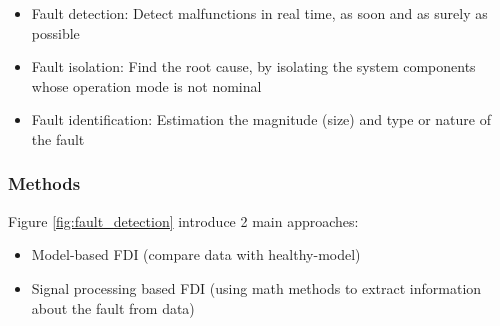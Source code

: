 \documentclass[class=article, crop=false]{standalone}
\begin{document}
\begin{itemize}
    \item{Fault detection: Detect malfunctions in real time, as soon and as
        surely as possible}
    \item{Fault isolation: Find the root cause, by isolating the system
        components whose operation mode is not nominal}
    \item{Fault identification: Estimation the magnitude (size) and type or
            nature of the fault}
\end{itemize}



\subsubsection{Methods}
Figure \ref{fig:fault_detection} introduce 2 main approaches:

\begin{itemize}
\item{Model-based FDI (compare data with healthy-model)}
\item{Signal processing based FDI (using math methods to extract information
    about the fault from data)}
\end{itemize}
\end{document}

